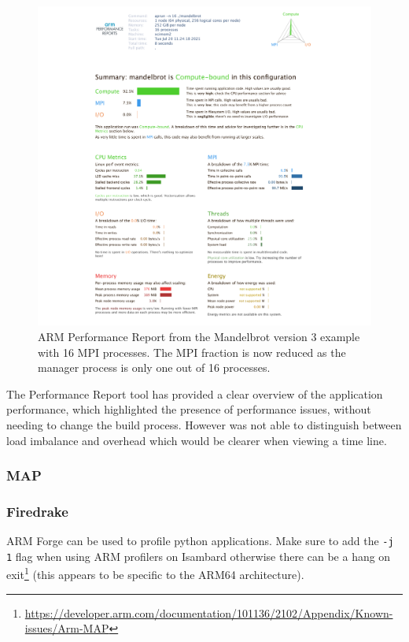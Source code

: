 \documentclass[a4paper,titlepage]{article}
\begin{document}
\begin{figure}[htbp]
\begin{center}
\includegraphics[scale=0.35]{figures/mandelbrot_v3_16procs_PerformanceReport}
\caption{ARM Performance Report from the Mandelbrot version 3 example with 16 MPI processes. The MPI fraction is now reduced as the manager process is only one out of 16 processes.}
\label{fig:perf-report_MB3_16procs}
\end{center}
\end{figure}

The Performance Report tool has provided a clear overview of the application performance, which highlighted the presence of performance issues, without needing to change the build process. However was not able to distinguish between load imbalance and overhead which would be clearer when viewing a time line.


\subsubsection{MAP}

\subsubsection{Firedrake}

ARM Forge can be used to profile python applications. 
Make sure to add the \verb+-j 1+ flag when using ARM profilers on Isambard otherwise there can be a hang on exit\footnote{\url{https://developer.arm.com/documentation/101136/2102/Appendix/Known-issues/Arm-MAP}} (this appears to be specific to the ARM64 architecture).
\end{document}
